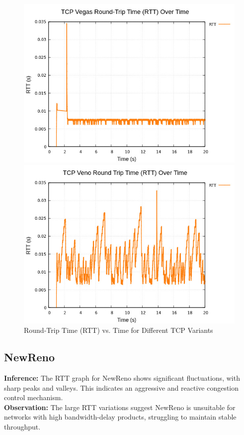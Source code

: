 \documentclass[11pt,a4paper]{article}
\begin{document}
\begin{figure}[h]
    \begin{minipage}{0.48\textwidth}
        \centering
        \includegraphics[width=\textwidth]{images/vegas_rtt.jpg}
    \end{minipage}\hfill
    \begin{minipage}{0.48\textwidth}
        \centering
        \includegraphics[width=\textwidth]{images/veno_rtt.jpg}
    \end{minipage}
    
    \caption{Round-Trip Time (RTT) vs. Time for Different TCP Variants}
    \label{fig:rtt_plots}
    \end{figure}
    \subsection{NewReno}
    \textbf{Inference:} The RTT graph for NewReno shows significant fluctuations, with sharp peaks and valleys. This indicates an aggressive and reactive congestion control mechanism.\\
    \textbf{Observation:} The large RTT variations suggest NewReno is unsuitable for networks with high bandwidth-delay products, struggling to maintain stable throughput.
    
\end{document}
